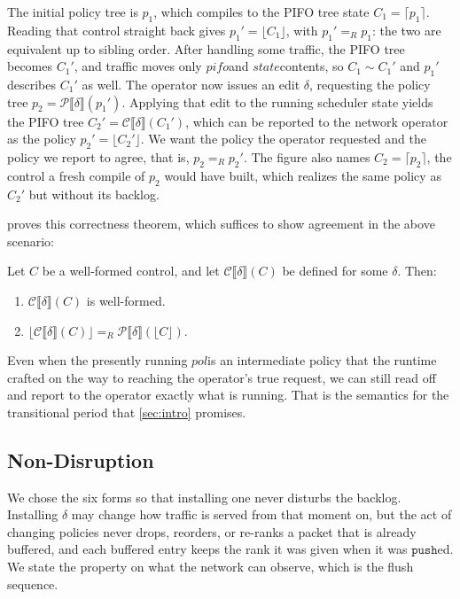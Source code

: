 \documentclass[sigplan,anonymous,review,nonacm]{acmart}
\newcommand{\push}{\ensuremath{\mathtt{push}}}
\newcommand{\csem}[1]{\mathcal{C}\llbracket #1 \rrbracket}
\newcommand{\psem}[1]{\mathcal{P}\llbracket #1 \rrbracket}
\newcommand{\eqR}{=_R}
\newcommand{\notation}[1]{\ensuremath{#1}\ifmmode\else\xspace\fi}
\newcommand{\pol}{\notation{\mathit{pol}}}
\newcommand{\pifo}{\notation{\mathit{pifo}}}
\newcommand{\stt}{\notation{\mathit{state}}}
\begin{document}
The initial policy tree is \(p_1\), which compiles to the PIFO tree state \(C_1 = \lceil p_1 \rceil\).
Reading that control straight back gives \(p_1' = \lfloor C_1 \rfloor\), with \(p_1' \eqR p_1\): the two are equivalent up to sibling order.
After handling some traffic, the PIFO tree becomes \(C_1'\), and traffic moves only \pifo and \stt contents, so \(C_1 \sim C_1'\) and \(p_1'\) describes \(C_1'\) as well.
The operator now issues an edit \(\delta\), requesting the policy tree \(p_2 = \psem{\delta}(p_1')\).
Applying that edit to the running scheduler state yields the PIFO tree \(C_2' = \csem{\delta}(C_1')\), which can be reported to the network operator as the policy \(p_2' = \lfloor C_2' \rfloor\).
We want the policy the operator requested and the policy we report to agree, that is, \(p_2 \eqR p_2'\).
The figure also names \(C_2 = \lceil p_2 \rceil\), the control a fresh compile of \(p_2\) would have built, which realizes the same policy as \(C_2'\) but without its backlog.

 proves this correctness theorem, which suffices to show agreement in the above scenario:
%
\begin{theorem}\label{thm:interplay}
Let \(C\) be a well-formed control, and let \(\csem{\delta}(C)\) be defined for some \(\delta\).
Then:
\begin{enumerate}
\item \(\csem{\delta}(C)\) is well-formed.
\item \(\lfloor \csem{\delta}(C) \rfloor \eqR \psem{\delta}(\lfloor C \rfloor)\).
\end{enumerate}
\end{theorem}

Even when the presently running \pol is an intermediate policy that the runtime crafted on the way to reaching the operator's true request, we can still read off and report to the operator exactly what is running.
That is the semantics for the transitional period that \cref{sec:intro} promises.

\subsection{Non-Disruption}\label{sec:nondisruption}

We chose the six forms so that installing one never disturbs the backlog.
Installing \(\delta\) may change how traffic is served from that moment on, but the act of changing policies never drops, reorders, or re-ranks a packet that is already buffered, and each buffered entry keeps the rank it was given when it was \push{}ed.
We state the property on what the network can observe, which is the flush sequence.
\end{document}
